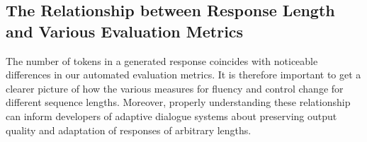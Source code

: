 

\subsection{The Relationship between Response Length and Various Evaluation Metrics}
\label{subsec:ctg_anal_response_length}

The number of tokens in a generated response coincides with noticeable differences in our automated evaluation metrics. It is therefore important to get a clearer picture of how the various measures for fluency and control change for different sequence lengths. Moreover, properly understanding these relationship can inform developers of adaptive dialogue systems about preserving output quality and adaptation of responses of arbitrary lengths.

